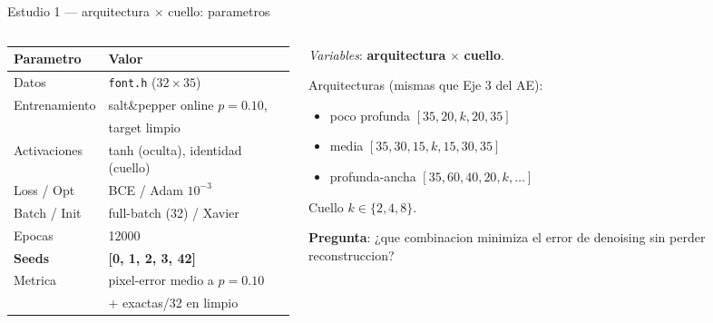 \documentclass[aspectratio=169, 10pt]{beamer}
\begin{document}
\begin{frame}{Estudio 1 --- arquitectura $\times$ cuello: parametros}
  \begin{columns}[T]
    \begin{column}{0.55\textwidth}
      \begin{table}\small
        \begin{tabular}{ll}
          \toprule
          Parametro & Valor \\
          \midrule
          Datos         & \texttt{font.h} ($32\times35$) \\
          Entrenamiento & salt\&pepper online $p{=}0.10$, \\
                        & target limpio \\
          Activaciones  & tanh (oculta), identidad (cuello) \\
          Loss / Opt    & BCE / Adam $10^{-3}$ \\
          Batch / Init  & full-batch (32) / Xavier \\
          Epocas        & 12000 \\
          \textbf{Seeds}& \textbf{[0, 1, 2, 3, 42]} \\
          Metrica       & pixel-error medio a $p{=}0.10$ \\
                        & + exactas/32 en limpio \\
          \bottomrule
        \end{tabular}
      \end{table}
    \end{column}
    \begin{column}{0.44\textwidth}
      \textit{Variables}: \textbf{arquitectura} $\times$ \textbf{cuello}.

      \vspace{0.5em}
      Arquitecturas (mismas que Eje 3 del AE):
      \begin{itemize}\small
        \item poco profunda $[35,20,k,20,35]$
        \item media $[35,30,15,k,15,30,35]$
        \item profunda-ancha $[35,60,40,20,k,\ldots]$
      \end{itemize}
      Cuello $k \in \{2, 4, 8\}$.

      \vspace{0.4em}
      \textbf{Pregunta}: ¿que combinacion minimiza el error de denoising
      sin perder reconstruccion?
    \end{column}
  \end{columns}
\end{frame}
\end{document}

